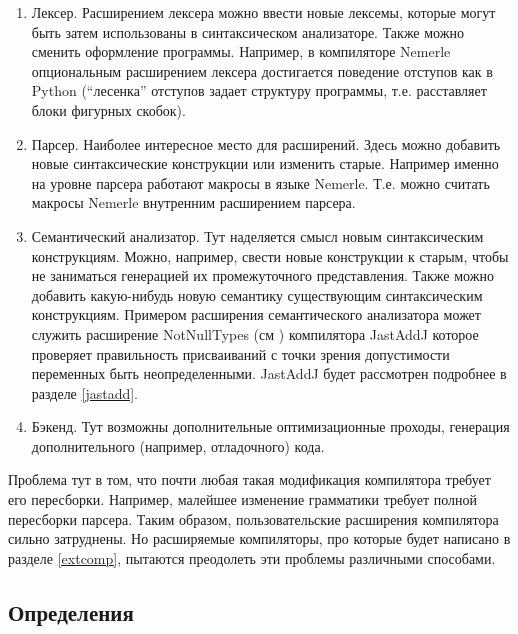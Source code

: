 \documentclass[a4paper,12pt,titlepage]{extarticle}
\begin{document}
\begin{enumerate}
  \item Лексер. Расширением лексера можно ввести новые лексемы, которые могут
  быть затем использованы в синтаксическом анализаторе. Также можно сменить
  оформление программы. Например, в компиляторе Nemerle опциональным расширением
  лексера достигается поведение отступов как в Python (``лесенка'' отступов
  задает структуру программы, т.е. расставляет блоки фигурных скобок).
  \item Парсер. Наиболее интересное место для расширений. Здесь можно добавить
  новые синтаксические конструкции или изменить старые. Например именно на
  уровне парсера работают макросы в языке Nemerle. Т.е. можно считать макросы Nemerle
  внутренним расширением парсера.
  \item Семантический анализатор. Тут наделяется смысл новым
  синтаксическим конструкциям. Можно, например, свести новые конструкции к
  старым, чтобы не заниматься генерацией их промежуточного представления.
  Также можно добавить какую-нибудь новую семантику существующим
  синтаксическим конструкциям. Примером расширения семантического анализатора
  может служить расширение NotNullTypes (см \cite{janotnull}) компилятора
  JastAddJ которое проверяет правильность присваиваний с точки зрения
  допустимости переменных быть неопределенными. JastAddJ будет
  рассмотрен подробнее в разделе \ref{jastadd}.
  \item Бэкенд. Тут возможны дополнительные оптимизационные проходы, генерация
  дополнительного (например, отладочного) кода.
\end{enumerate}
Проблема тут в том, что почти любая такая модификация компилятора требует его
пересборки. Например, малейшее изменение грамматики требует полной пересборки
парсера. Таким образом, пользовательские расширения компилятора сильно
затруднены. Но расширяемые компиляторы, про которые будет написано в разделе
\ref{extcomp}, пытаются преодолеть эти проблемы различными способами.

\subsection{Определения}
\end{document}

